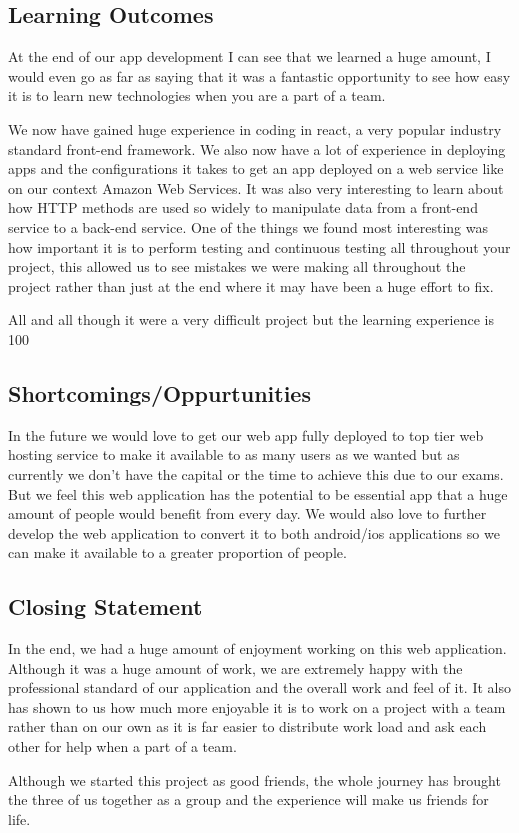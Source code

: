 \subsection{Learning Outcomes}
At the end of our app development I can see that we learned a huge amount, I would even go as far as saying that it was a fantastic opportunity to see how easy it is to learn new technologies when you are a part of a team.
\par
We now have gained huge experience in coding in react, a very popular industry standard front-end framework. We also now have a lot of experience in deploying apps and the configurations it takes to get an app deployed on a web service like on our context Amazon Web Services. It was also very interesting to learn about how HTTP methods are used so widely to manipulate data from a front-end service to a back-end service. One of the things we found most interesting was how important it is to perform testing and continuous testing all throughout your project, this allowed us to see mistakes we were making all throughout the project rather than just at the end where it may have been a huge effort to fix.
\par
All and all though it were a very difficult project but the learning experience is 100%

\subsection{Shortcomings/Oppurtunities}
In the future we would love to get our web app fully deployed to top tier web hosting service to make it available to as many users as we wanted but as currently we don’t have the capital or the time to achieve this due to our exams. But we feel this web application has the potential to be essential app that a huge amount of people would benefit from every day. We would also love to further develop the web application to convert it to both android/ios applications so we can make it available to a greater proportion of people.

\subsection{Closing Statement}
In the end, we had a huge amount of enjoyment working on this web application. Although it was a huge amount of work, we are extremely happy with the professional standard of our application and the overall work and feel of it. It also has shown to us how much more enjoyable it is to work on a project with a team rather than on our own as it is far easier to distribute work load and ask each other for help when a part of a team. 
\par
Although we started this project as good friends, the whole journey has brought the three of us together as a group and the experience will make us friends for life.


